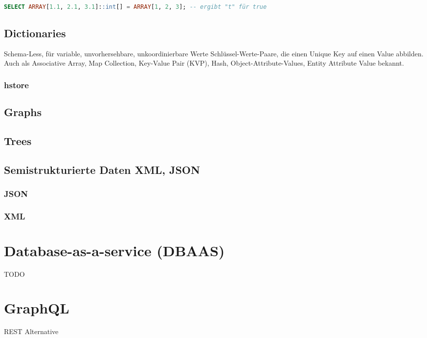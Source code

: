 \documentclass[a4paper, landscape, 8pt]{scrartcl}
\begin{document}
\begin{multicols*}{4}
        \begin{lstlisting}[language=sql]
            SELECT ARRAY[1.1, 2.1, 3.1]::int[] = ARRAY[1, 2, 3]; -- ergibt "t" für true
        \end{lstlisting}

        \subsection{Dictionaries}
        Schema-Less, für variable, unvorhersehbare, unkoordinierbare Werte
        Schlüssel-Werte-Paare, die einen Unique Key auf einen Value abbilden.
        Auch als Associative Array, Map Collection, Key-Value Pair (KVP), Hash, Object-Attribute-Values, Entity Attribute Value bekannt.

        \subsubsection{hstore}

        \subsection{Graphs}
        \subsection{Trees}
        
        \subsection{Semistrukturierte Daten {\tiny XML, JSON}}
        \subsubsection{JSON}

        \subsubsection{XML}


        \section{Database-as-a-service (DBAAS)}
        TODO

        \section{GraphQL}
        REST Alternative




\end{multicols*}
\end{document}

